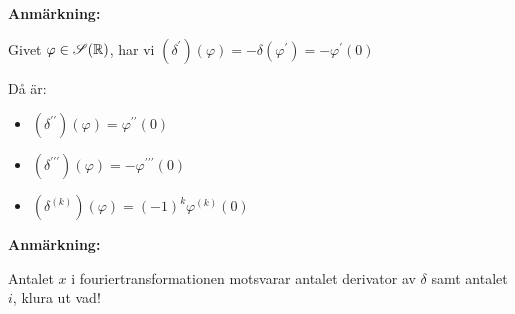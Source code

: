 \par\bigskip
\noindent\textbf{Anmärkning:}\par
\noindent Givet $\varphi\in\mathscr{S}(\mathbb{R})$, har vi $(\delta^{\prime})(\varphi) = -\delta(\varphi^{\prime}) = -\varphi^{\prime}(0)$\par
\noindent Då är:\par
\begin{itemize}
  \item $(\delta^{\prime\prime})(\varphi) = \varphi^{\prime\prime}(0)$
  \item $(\delta^{\prime\prime\prime})(\varphi) = -\varphi^{\prime\prime\prime}(0)$
  \item $(\delta^{(k)})(\varphi) = (-1)^k\varphi^{(k)}(0)$
\end{itemize}
\par\bigskip
\noindent\textbf{Anmärkning:}\par
\noindent Antalet $x$ i fouriertransformationen motsvarar antalet derivator av $\delta$ samt antalet $i$, klura ut vad! 

